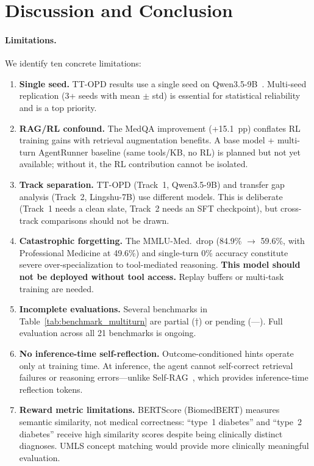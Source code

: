 \documentclass{article}
\begin{document}
\section{Discussion and Conclusion}
\label{sec:discussion}

\paragraph{Limitations.} We identify ten concrete limitations:
\begin{enumerate}[leftmargin=*,itemsep=1pt,topsep=2pt]
    \item \textbf{Single seed.} TT-OPD results use a single seed on Qwen3.5-9B~\citep{yang2024qwen25}. Multi-seed replication (3+ seeds with mean $\pm$ std) is essential for statistical reliability and is a top priority.
    \item \textbf{RAG/RL confound.} The MedQA improvement (+15.1~pp) conflates RL training gains with retrieval augmentation benefits. A base model + multi-turn AgentRunner baseline (same tools/KB, no RL) is planned but not yet available; without it, the RL contribution cannot be isolated.
    \item \textbf{Track separation.} TT-OPD (Track~1, Qwen3.5-9B) and transfer gap analysis (Track~2, Lingshu-7B) use different models. This is deliberate (Track~1 needs a clean slate, Track~2 needs an SFT checkpoint), but cross-track comparisons should not be drawn.
    \item \textbf{Catastrophic forgetting.} The MMLU-Med.\ drop (84.9\% $\to$ 59.6\%, with Professional Medicine at 49.6\%) and single-turn 0\% accuracy constitute severe over-specialization to tool-mediated reasoning. \textbf{This model should not be deployed without tool access.} Replay buffers or multi-task training are needed.
    \item \textbf{Incomplete evaluations.} Several benchmarks in Table~\ref{tab:benchmark_multiturn} are partial ($\dagger$) or pending (---). Full evaluation across all 21 benchmarks is ongoing.
    \item \textbf{No inference-time self-reflection.} Outcome-conditioned hints operate only at training time. At inference, the agent cannot self-correct retrieval failures or reasoning errors---unlike Self-RAG~\citep{asai2023selfrag}, which provides inference-time reflection tokens.
    \item \textbf{Reward metric limitations.} BERTScore (BiomedBERT) measures semantic similarity, not medical correctness: ``type~1 diabetes'' and ``type~2 diabetes'' receive high similarity scores despite being clinically distinct diagnoses. UMLS concept matching would provide more clinically meaningful evaluation.

\end{enumerate}
\end{document}
